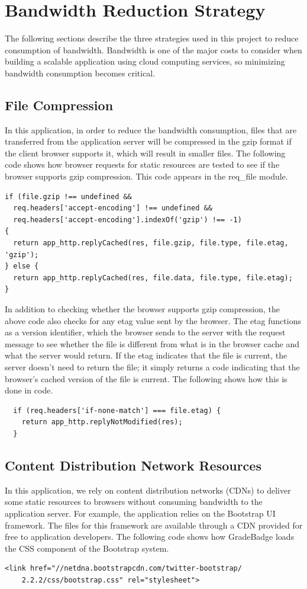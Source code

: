\section{Bandwidth Reduction Strategy}
The following sections describe the three strategies used in this project to reduce consumption of bandwidth.  Bandwidth is one of the major costs to consider when building a scalable application using cloud computing services, so minimizing bandwidth consumption becomes critical.

\subsection{File Compression}
In this application, in order to reduce the bandwidth consumption, files that are transferred from the application server will be compressed in the gzip format if the client browser supports it, which will result in smaller files. The following code shows how browser requests for static resources are tested to see if the browser supports gzip compression.  This code appears in the req{\_}file module.

\begin{lstlisting}
if (file.gzip !== undefined && 
  req.headers['accept-encoding'] !== undefined && 
  req.headers['accept-encoding'].indexOf('gzip') !== -1) 
{
  return app_http.replyCached(res, file.gzip, file.type, file.etag, 'gzip');
} else {
  return app_http.replyCached(res, file.data, file.type, file.etag);
}
\end{lstlisting}

In addition to checking whether the browser supports gzip compression, the above code also checks for any etag value sent by the browser.  The etag functions as a version identifier, which the browser sends to the server with the request message to see whether the file is different from what is in the browser cache and what the server would return.  If the etag indicates that the file is current, the server doesn't need to return the file; it simply returns a code indicating that the browser's cached version of the file is current. The following shows how this is done in code.
 
\begin{lstlisting}
  if (req.headers['if-none-match'] === file.etag) {
    return app_http.replyNotModified(res);
  }
\end{lstlisting}

\subsection{Content Distribution Network Resources}
In this application, we rely on content distribution networks (CDNs) to deliver some static resources to browsers without consuming bandwidth to the application server.  For example, the application relies on the Bootstrap UI framework.  The files for this framework are available through a CDN provided for free to application developers.  The following code shows how GradeBadge loads the CSS component of the Bootstrap system.
\begin{lstlisting}
<link href="//netdna.bootstrapcdn.com/twitter-bootstrap/
    2.2.2/css/bootstrap.css" rel="stylesheet">
\end{lstlisting}

